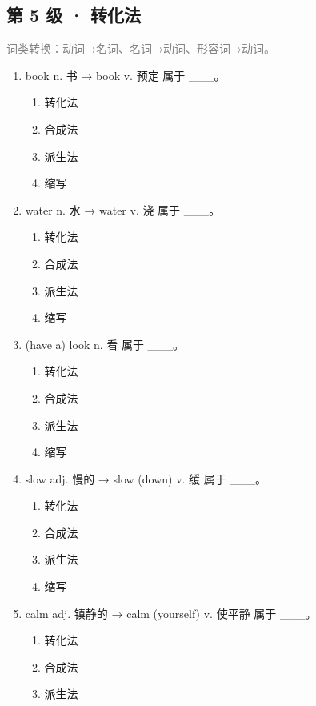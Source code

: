 \documentclass[11pt,a4paper]{ctexart}
\begin{document}
\subsection*{第 5 级 · 转化法}
\noindent\textcolor{gray}{词类转换：动词→名词、名词→动词、形容词→动词。}\par\smallskip
\begin{enumerate}[leftmargin=*,itemsep=4pt]
\item book n. 书 → book v. 预定 属于 \_\_\_。
\begin{enumerate}[label=\Alph*.,leftmargin=2em,itemsep=1pt,topsep=2pt]
\item 转化法
\item 合成法
\item 派生法
\item 缩写
\end{enumerate}
\item water n. 水 → water v. 浇 属于 \_\_\_。
\begin{enumerate}[label=\Alph*.,leftmargin=2em,itemsep=1pt,topsep=2pt]
\item 转化法
\item 合成法
\item 派生法
\item 缩写
\end{enumerate}
\item (have a) look n. 看 属于 \_\_\_。
\begin{enumerate}[label=\Alph*.,leftmargin=2em,itemsep=1pt,topsep=2pt]
\item 转化法
\item 合成法
\item 派生法
\item 缩写
\end{enumerate}
\item slow adj. 慢的 → slow (down) v. 缓 属于 \_\_\_。
\begin{enumerate}[label=\Alph*.,leftmargin=2em,itemsep=1pt,topsep=2pt]
\item 转化法
\item 合成法
\item 派生法
\item 缩写
\end{enumerate}
\item calm adj. 镇静的 → calm (yourself) v. 使平静 属于 \_\_\_。
\begin{enumerate}[label=\Alph*.,leftmargin=2em,itemsep=1pt,topsep=2pt]
\item 转化法
\item 合成法
\item 派生法

\end{enumerate}
\end{enumerate}
\end{document}
